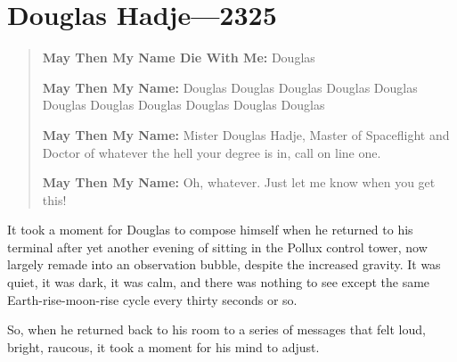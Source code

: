 \hypertarget{douglas-hadje-2325}{%
\chapter{Douglas Hadje—2325}\label{douglas-hadje-2325}}

\begin{quote}
\textbf{May Then My Name Die With Me:} Douglas

\textbf{May Then My Name:} Douglas Douglas Douglas Douglas Douglas Douglas Douglas Douglas Douglas Douglas Douglas

\textbf{May Then My Name:} Mister Douglas Hadje, Master of Spaceflight and Doctor of whatever the hell your degree is in, call on line one.

\textbf{May Then My Name:} Oh, whatever. Just let me know when you get this!
\end{quote}

\noindent It took a moment for Douglas to compose himself when he returned to his terminal after yet another evening of sitting in the Pollux control tower, now largely remade into an observation bubble, despite the increased gravity. It was quiet, it was dark, it was calm, and there was nothing to see except the same Earth-rise-moon-rise cycle every thirty seconds or so.

So, when he returned back to his room to a series of messages that felt loud, bright, raucous, it took a moment for his mind to adjust.

